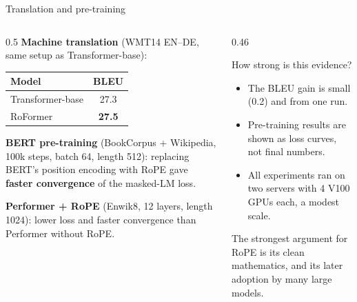\documentclass[aspectratio=169,11pt]{beamer}
\begin{document}
\begin{frame}{Translation and pre-training}
  \begin{columns}[T]
    \begin{column}{0.5\textwidth}
      \small
      \textbf{Machine translation} (WMT14 EN--DE, same setup as Transformer-base):
      \vspace{1mm}

      \begin{tabular}{@{}lc@{}}
        \toprule
        Model & BLEU\\
        \midrule
        Transformer-base & 27.3\\
        RoFormer & \textbf{27.5}\\
        \bottomrule
      \end{tabular}
      \vspace{2mm}

      \textbf{BERT pre-training} (BookCorpus + Wikipedia, 100k steps, batch 64, length 512): replacing BERT's position encoding with RoPE gave \textbf{faster convergence} of the masked-LM loss.
      \vspace{1mm}

      \textbf{Performer + RoPE} (Enwik8, 12 layers, length 1024): lower loss and faster convergence than Performer without RoPE.
    \end{column}
    \begin{column}{0.46\textwidth}
      \begin{alertblock}{How strong is this evidence?}
        \small
        \begin{itemize}
          \item The BLEU gain is small (0.2) and from one run.
          \item Pre-training results are shown as loss curves, not final numbers.
          \item All experiments ran on two servers with 4 V100 GPUs each, a modest scale.
        \end{itemize}
        The strongest argument for RoPE is its clean mathematics, and its later adoption by many large models.
      \end{alertblock}
    \end{column}
  \end{columns}
\end{frame}
\end{document}
